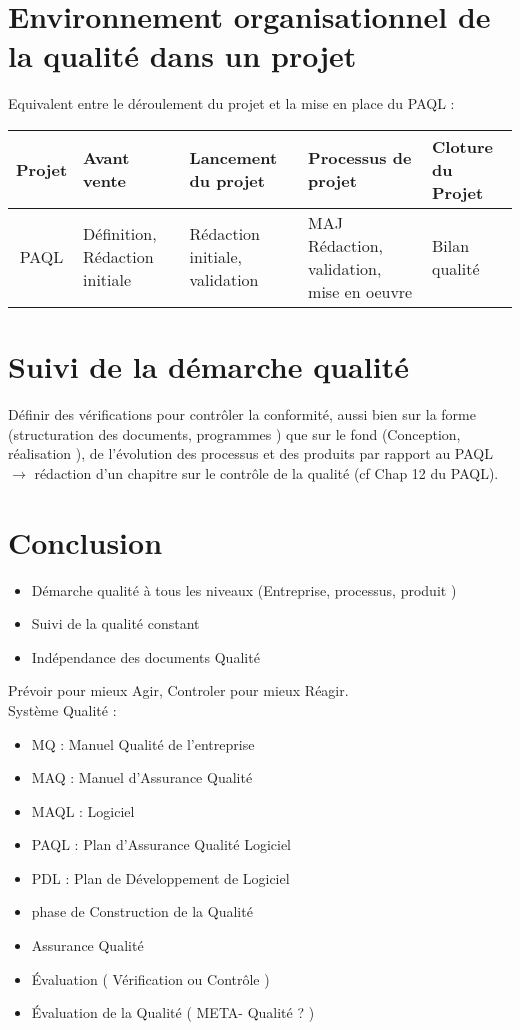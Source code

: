 \section{Environnement organisationnel de la qualité dans un projet}


Equivalent entre le déroulement du projet et la mise en place du PAQL :\\

\begin{tabular}{|c|p{3cm}|p{3cm}|p{3cm}|p{3cm}|}
\hline
Projet & Avant vente & Lancement du projet & Processus de projet & Cloture du Projet\\
\hline
PAQL & Définition, Rédaction initiale & Rédaction initiale, validation & MAJ Rédaction, validation, mise en oeuvre & Bilan qualité\\
\hline
\end{tabular}

\section{Suivi de la démarche qualité}

Définir des vérifications pour contrôler la conformité, aussi bien sur la forme (structuration des documents, programmes ) que sur le fond (Conception, réalisation ), de l’évolution des processus et des produits par rapport au PAQL $\rightarrow$ rédaction d’un chapitre sur le contrôle de la qualité (cf Chap 12 du PAQL).

\section{Conclusion}

\begin{itemize}
\item Démarche qualité à tous les niveaux (Entreprise, processus, produit )
\item Suivi de la qualité constant
\item Indépendance des documents Qualité
\end{itemize}

Prévoir pour mieux Agir, Controler pour mieux Réagir.\\

Système Qualité :
\begin{itemize}
\item MQ : Manuel Qualité de l’entreprise
\item MAQ : Manuel d’Assurance Qualité  
\item MAQL :   			 	          Logiciel
\item PAQL : Plan d’Assurance Qualité Logiciel
\item PDL : Plan de Développement de Logiciel 
\item phase de Construction de la Qualité
\item Assurance Qualité
\item Évaluation ( Vérification ou Contrôle )
\item Évaluation de la Qualité ( META- Qualité ? )
\end{itemize}

